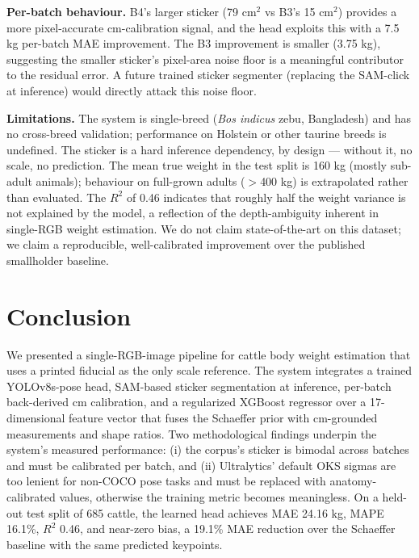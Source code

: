 \documentclass[conference]{IEEEtran}
\begin{document}
\textbf{Per-batch behaviour.} B4's larger sticker (79 cm$^2$ vs B3's 15 cm$^2$) provides a more pixel-accurate cm-calibration signal, and the head exploits this with a 7.5 kg per-batch MAE improvement. The B3 improvement is smaller (3.75 kg), suggesting the smaller sticker's pixel-area noise floor is a meaningful contributor to the residual error. A future trained sticker segmenter (replacing the SAM-click at inference) would directly attack this noise floor.

\textbf{Limitations.}
The system is single-breed (\textit{Bos indicus} zebu, Bangladesh) and has no cross-breed validation; performance on Holstein or other taurine breeds is undefined. The sticker is a hard inference dependency, by design --- without it, no scale, no prediction. The mean true weight in the test split is 160 kg (mostly sub-adult animals); behaviour on full-grown adults ($>$400 kg) is extrapolated rather than evaluated. The $R^2$ of 0.46 indicates that roughly half the weight variance is not explained by the model, a reflection of the depth-ambiguity inherent in single-RGB weight estimation. We do not claim state-of-the-art on this dataset; we claim a reproducible, well-calibrated improvement over the published smallholder baseline.

\section{Conclusion}
\label{sec:conclusion}

We presented a single-RGB-image pipeline for cattle body weight estimation that uses a printed fiducial as the only scale reference. The system integrates a trained YOLOv8s-pose head, SAM-based sticker segmentation at inference, per-batch back-derived cm calibration, and a regularized XGBoost regressor over a 17-dimensional feature vector that fuses the Schaeffer prior with cm-grounded measurements and shape ratios. Two methodological findings underpin the system's measured performance: (i) the corpus's sticker is bimodal across batches and must be calibrated per batch, and (ii) Ultralytics' default OKS sigmas are too lenient for non-COCO pose tasks and must be replaced with anatomy-calibrated values, otherwise the training metric becomes meaningless. On a held-out test split of 685 cattle, the learned head achieves MAE 24.16 kg, MAPE 16.1\%, $R^2$ 0.46, and near-zero bias, a 19.1\% MAE reduction over the Schaeffer baseline with the same predicted keypoints.
\end{document}
